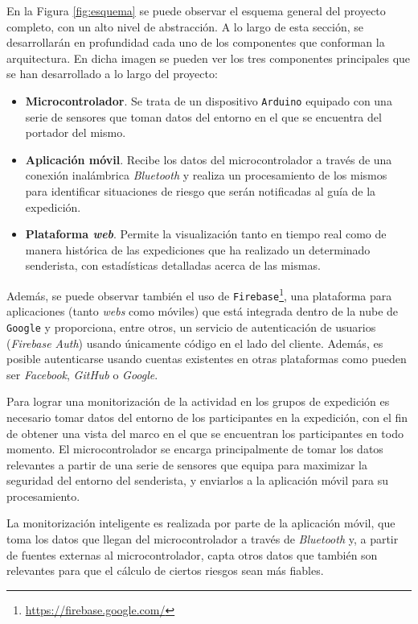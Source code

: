 En la Figura \ref{fig:esquema} se puede observar el esquema general del proyecto completo, con un alto nivel de abstracción. A lo largo de esta sección, se desarrollarán en profundidad cada uno de los componentes que conforman la arquitectura. En dicha imagen se pueden ver los tres componentes principales que se han desarrollado a lo largo del proyecto:

\begin{itemize}
\item \textbf{Microcontrolador}. Se trata de un dispositivo \texttt{Arduino} equipado con una serie de sensores que toman datos del entorno en el que se encuentra del portador del mismo.
\item \textbf{Aplicación móvil}. Recibe los datos del microcontrolador a través de una conexión inalámbrica \textit{Bluetooth} y realiza un procesamiento de los mismos para identificar situaciones de riesgo que serán notificadas al guía de la expedición.
\item \textbf{Plataforma \textit{web}}. Permite la visualización tanto en tiempo real como de manera histórica de las expediciones que ha realizado un determinado senderista, con estadísticas detalladas acerca de las mismas.
\end{itemize}

Además, se puede observar también el uso de \texttt{Firebase}\footnote{\url{https://firebase.google.com/}}, una plataforma para aplicaciones (tanto \textit{webs} como móviles) que está integrada dentro de la nube de \texttt{Google} y proporciona, entre otros, un servicio de autenticación de usuarios (\textit{Firebase Auth}) usando únicamente código en el lado del cliente. Además, es posible autenticarse usando cuentas existentes en otras plataformas como pueden ser \textit{Facebook}, \textit{GitHub} o \textit{Google}.

Para lograr una monitorización de la actividad en los grupos de expedición es necesario tomar datos del entorno de los participantes en la expedición, con el fin de obtener una vista del marco en el que se encuentran los participantes en todo momento. El microcontrolador se encarga principalmente de tomar los datos relevantes a partir de una serie de sensores que equipa para maximizar la seguridad del entorno del senderista, y enviarlos a la aplicación móvil para su procesamiento.

La monitorización inteligente es realizada por parte de la aplicación móvil, que toma los datos que llegan del microcontrolador a través de \textit{Bluetooth} y, a partir de fuentes externas al microcontrolador, capta otros datos que también son relevantes para que el cálculo de ciertos riesgos sean más fiables.

